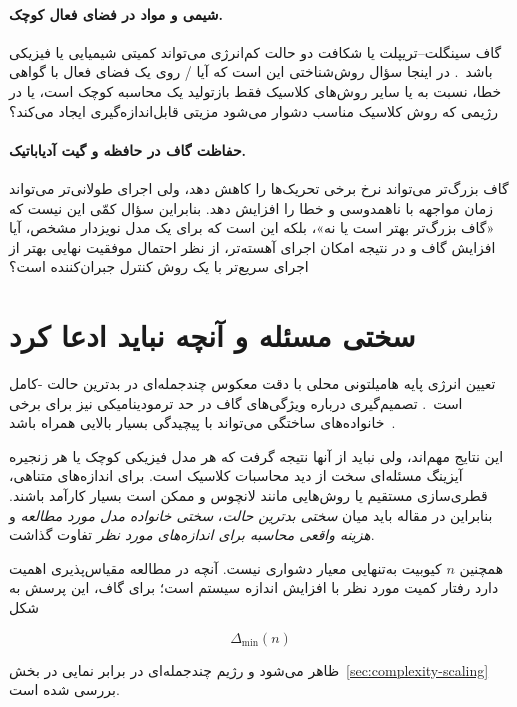 \paragraph{شیمی و مواد در فضای فعال کوچک.}
گاف سینگلت--تریپلت یا شکافت دو حالت کم‌انرژی می‌تواند کمیتی شیمیایی یا فیزیکی باشد~\cite{McArdle2020,GapHiggott2019}.
در اینجا سؤال روش‌شناختی این است که آیا / روی یک فضای فعال با گواهی خطا، نسبت به  یا سایر روش‌های کلاسیک فقط بازتولید یک محاسبه کوچک است، یا در رژیمی که روش کلاسیک مناسب دشوار می‌شود مزیتی قابل‌اندازه‌گیری ایجاد می‌کند؟

\paragraph{حفاظت گاف در حافظه و گیت آدیاباتیک.}
گاف بزرگ‌تر می‌تواند نرخ برخی تحریک‌ها را کاهش دهد، ولی اجرای طولانی‌تر می‌تواند زمان مواجهه با ناهمدوسی و خطا را افزایش دهد.
بنابراین سؤال کمّی این نیست که «گاف بزرگ‌تر بهتر است یا نه»، بلکه این است که برای یک مدل نویزدار مشخص، آیا افزایش گاف و در نتیجه امکان اجرای آهسته‌تر، از نظر احتمال موفقیت نهایی بهتر از اجرای سریع‌تر با یک روش کنترل جبران‌کننده است؟

\section{سختی مسئله و آنچه نباید ادعا کرد}

تعیین انرژی پایه هامیلتونی محلی با دقت معکوس چندجمله‌ای در بدترین حالت -کامل است~\cite{GapGharibian2015}.
تصمیم‌گیری درباره ویژگی‌های گاف در حد ترمودینامیکی نیز برای برخی خانواده‌های ساختگی می‌تواند با پیچیدگی بسیار بالایی همراه باشد~\cite{GapCubitt2015}.

این نتایج مهم‌اند، ولی نباید از آنها نتیجه گرفت که هر مدل فیزیکی کوچک یا هر زنجیره آیزینگ مسئله‌ای سخت از دید محاسبات کلاسیک است.
برای اندازه‌های متناهی، قطری‌سازی مستقیم یا روش‌هایی مانند لانچوس و  ممکن است بسیار کارآمد باشند.
بنابراین در مقاله باید میان \emph{سختی بدترین حالت}، \emph{سختی خانواده مدل مورد مطالعه} و \emph{هزینه واقعی محاسبه برای اندازه‌های مورد نظر} تفاوت گذاشت.

همچنین $n$ کیوبیت به‌تنهایی معیار دشواری نیست.
آنچه در مطالعه مقیاس‌پذیری اهمیت دارد رفتار کمیت مورد نظر با افزایش اندازه سیستم است؛ برای گاف، این پرسش به شکل

\begin{equation}
	\Delta_{\min}(n)
\end{equation}

ظاهر می‌شود و رژیم چندجمله‌ای در برابر نمایی در بخش~\ref{sec:complexity-scaling} بررسی شده است.

